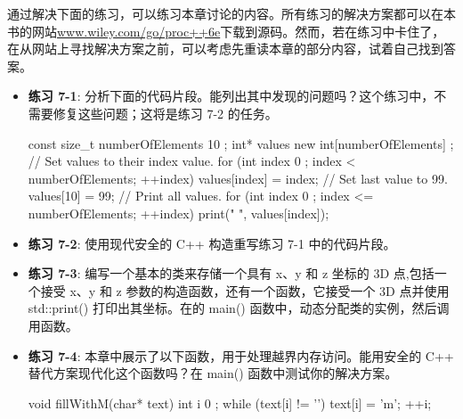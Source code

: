 通过解决下面的练习，可以练习本章讨论的内容。所有练习的解决方案都可以在本书的网站\url{www.wiley.com/go/proc++6e}下载到源码。然而，若在练习中卡住了，在从网站上寻找解决方案之前，可以考虑先重读本章的部分内容，试着自己找到答案。

\begin{itemize}
\item
\textbf{练习 7-1}: 分析下面的代码片段。能列出其中发现的问题吗？这个练习中，不需要修复这些问题；这将是练习 7-2 的任务。

\begin{cpp}
const size_t numberOfElements { 10 };
int* values { new int[numberOfElements] };
// Set values to their index value.
for (int index { 0 }; index < numberOfElements; ++index) {
    values[index] = index;
}
// Set last value to 99.
values[10] = 99;
// Print all values.
for (int index { 0 }; index <= numberOfElements; ++index) {
    print("{} ", values[index]);
}
\end{cpp}

\item
\textbf{练习 7-2}: 使用现代安全的 C++ 构造重写练习 7-1 中的代码片段。

\item
\textbf{练习 7-3}: 编写一个基本的类来存储一个具有 x、y 和 z 坐标的 3D 点,包括一个接受 x、y 和 z 参数的构造函数，还有一个函数，它接受一个 3D 点并使用 std::print() 打印出其坐标。在的 main() 函数中，动态分配类的实例，然后调用函数。

\item
\textbf{练习 7-4}: 本章中展示了以下函数，用于处理越界内存访问。能用安全的 C++ 替代方案现代化这个函数吗？在 main() 函数中测试你的解决方案。

\begin{cpp}
void fillWithM(char* text)
{
    int i { 0 };
    while (text[i] != '\0') {
        text[i] = 'm';
        ++i;
    }
}
\end{cpp}
\end{itemize}